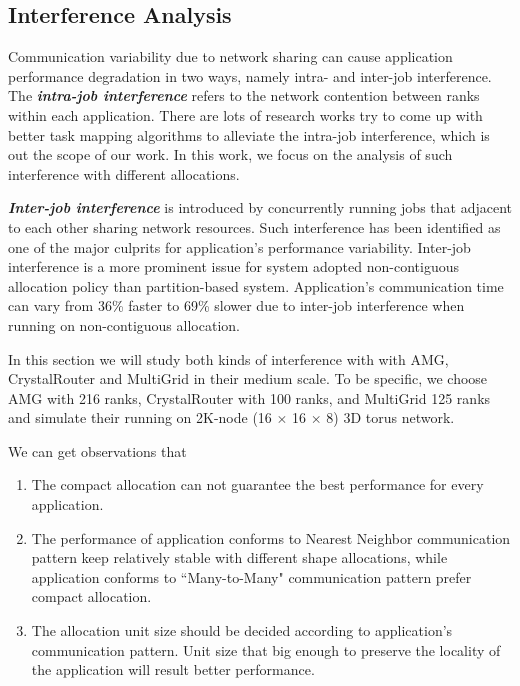 \documentclass[conference]{IEEEtran}
\begin{document}
\subsection{Interference Analysis}
\label{sec:interference}

Communication variability due to network sharing can cause application performance degradation in two ways, namely intra- and inter-job interference. The \textbf{\emph{intra-job interference}} refers to the network contention between ranks within each application. There are lots of research works\cite{jingjin}\cite{ozan} try to come up with better task mapping algorithms to alleviate the intra-job interference, which is out the scope of our work. In this work, we focus on the analysis of such interference with different allocations.

\textbf{\emph{Inter-job interference}} is introduced by concurrently running jobs that adjacent to each other sharing network resources. Such interference has been identified as one of the major culprits for application's performance variability\cite{abhinav-sc13}\cite{skinner}\cite{rosenthal}. Inter-job interference is a more prominent issue for system adopted non-contiguous allocation policy than partition-based system. Application's communication time can vary from 36\% faster to 69\% slower due to inter-job interference when running on non-contiguous allocation\cite{abhinav-sc13}.

In this section we will study both kinds of interference with with AMG, CrystalRouter and MultiGrid in their medium scale. To be specific, we choose AMG with 216 ranks, CrystalRouter with 100 ranks, and MultiGrid 125 ranks and simulate their running on 2K-node (16 $\times$ 16 $\times$ 8) 3D torus network.

We can get observations that 
\begin{enumerate}
    \item The compact allocation can not guarantee the best performance for every application. 
    \item The performance of application conforms to Nearest Neighbor communication pattern keep relatively stable with different shape allocations, while application conforms to ``Many-to-Many" communication pattern prefer compact allocation. 
    \item The allocation unit size should be decided according to application's communication pattern. Unit size that big enough to preserve the locality of the application will result better performance. 
\end{enumerate}
\end{document}
